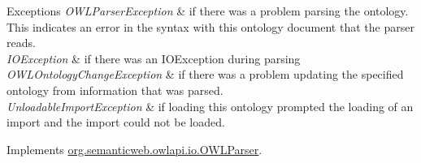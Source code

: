 \begin{DoxyExceptions}{Exceptions}
{\em O\-W\-L\-Parser\-Exception} & if there was a problem parsing the ontology. This indicates an error in the syntax with this ontology document that the parser reads. \\
\hline
{\em I\-O\-Exception} & if there was an I\-O\-Exception during parsing \\
\hline
{\em O\-W\-L\-Ontology\-Change\-Exception} & if there was a problem updating the specified ontology from information that was parsed. \\
\hline
{\em Unloadable\-Import\-Exception} & if loading this ontology prompted the loading of an import and the import could not be loaded. \\
\hline
\end{DoxyExceptions}


Implements \hyperlink{interfaceorg_1_1semanticweb_1_1owlapi_1_1io_1_1_o_w_l_parser_a2d4a9b4fc9206b0661fbd2c8ee0e1f3b}{org.\-semanticweb.\-owlapi.\-io.\-O\-W\-L\-Parser}.

